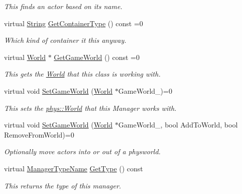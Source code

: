\begin{DoxyCompactItemize}
\begin{DoxyCompactList}\small\item\em This finds an actor based on its name. \item\end{DoxyCompactList}\item 
virtual \hyperlink{namespacephys_aa03900411993de7fbfec4789bc1d392e}{String} \hyperlink{classphys_1_1ActorContainerBase_a0ed43bc828aaee8ee33152970c3cc16d}{GetContainerType} () const =0
\begin{DoxyCompactList}\small\item\em Which kind of container it this anyway. \item\end{DoxyCompactList}\item 
virtual \hyperlink{classphys_1_1World}{World} $\ast$ \hyperlink{classphys_1_1ActorContainerBase_a479e6c7434f2611b0cfe6ca1fd4ebdd1}{GetGameWorld} () const =0
\begin{DoxyCompactList}\small\item\em This gets the \hyperlink{classphys_1_1World}{World} that this class is working with. \item\end{DoxyCompactList}\item 
virtual void \hyperlink{classphys_1_1ActorContainerBase_ae0cb5c288f17507247dd98d3a2466876}{SetGameWorld} (\hyperlink{classphys_1_1World}{World} $\ast$GameWorld\_\-)=0
\begin{DoxyCompactList}\small\item\em This sets the \hyperlink{classphys_1_1World}{phys::World} that this Manager works with. \item\end{DoxyCompactList}\item 
virtual void \hyperlink{classphys_1_1ActorContainerBase_a366c1797bef08f3a1846bf010e2e2b04}{SetGameWorld} (\hyperlink{classphys_1_1World}{World} $\ast$GameWorld\_\-, bool AddToWorld, bool RemoveFromWorld)=0
\begin{DoxyCompactList}\small\item\em Optionally move actors into or out of a physworld. \item\end{DoxyCompactList}\item 
virtual \hyperlink{classphys_1_1ManagerBase_aaa6ccddf23892eaccb898529414f80a5}{ManagerTypeName} \hyperlink{classphys_1_1ActorContainerBase_aa86380fd1b18d660f68b60f075967cf8}{GetType} () const 
\begin{DoxyCompactList}\small\item\em This returns the type of this manager. \item\end{DoxyCompactList}\item 

\end{DoxyCompactItemize}
